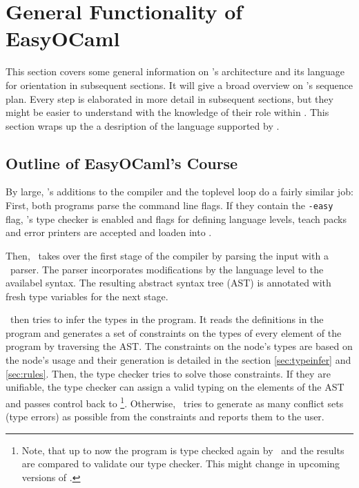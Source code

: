 
\section{General Functionality of EasyOCaml}
\label{sec:general}

This section covers some general information on \easyocaml's architecture and
its language for orientation in subsequent sections.
It will give a broad overview on \easyocaml's sequence plan.
Every step is elaborated in more detail in subsequent sections, but they might
be easier to understand with the knowledge of their role within \easyocaml.
This section wraps up the a desription of the language supported by \easyocaml.

\subsection{Outline of EasyOCaml's Course}

By large, \easyocaml's additions to the compiler and the toplevel loop do a
fairly similar job: First, both programs parse the command line flags. If they
contain the \texttt{-easy} flag, \easyocaml's type checker is enabled and flags
for defining language levels, teach packs and error printers are accepted and
loaden into \easyocaml.

Then, \easyocaml\ takes over the first stage of the compiler by parsing the
input with a \camlpf\ parser. The parser incorporates modifications by the
language level to the availabel syntax. The resulting abstract syntax tree (AST)
is annotated with fresh type variables for the next stage.

\easyocaml\ then tries to infer the types in the program. It reads the definitions in
the program and generates a set of constraints on the types of every element of
the program by traversing the AST. The constraints on the node's types are based
on the node's usage and their generation is detailed in the section
\ref{sec:typeinfer} and \ref{sec:rules}.
Then, the type checker tries to solve those constraints. If they are unifiable,
the type checker can assign a valid typing on the elements of the AST and passes
control back to \ocaml\footnote{Note, that up to now the program is type checked
again by \ocaml\ and the results are compared to validate our type checker. This
might change in upcoming versions of \easyocaml.}.
Otherwise, \easyocaml\ tries to generate as many conflict sets (type errors) as
possible from the constraints and reports them to the user.

